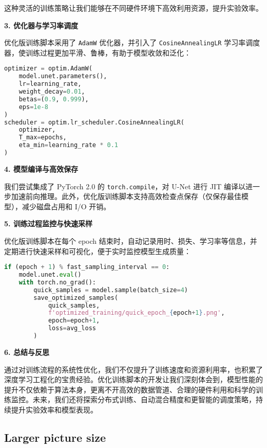 \documentclass{ctexart}
\begin{document}
这种灵活的训练策略让我们能够在不同硬件环境下高效利用资源，提升实验效率。

\vspace{0.5em}
\noindent
\textbf{3. 优化器与学习率调度}

优化版训练脚本采用了 \texttt{AdamW} 优化器，并引入了 \texttt{CosineAnnealingLR} 学习率调度器，使训练过程更加平滑、鲁棒，有助于模型收敛和泛化：

\begin{lstlisting}[language=python]
optimizer = optim.AdamW(
    model.unet.parameters(), 
    lr=learning_rate,
    weight_decay=0.01,
    betas=(0.9, 0.999),
    eps=1e-8
)
scheduler = optim.lr_scheduler.CosineAnnealingLR(
    optimizer, 
    T_max=epochs,
    eta_min=learning_rate * 0.1
)
\end{lstlisting}

\vspace{0.5em}
\noindent
\textbf{4. 模型编译与高效保存}

我们尝试集成了 PyTorch 2.0 的 \texttt{torch.compile}，对 U-Net 进行 JIT 编译以进一步加速前向推理。此外，优化版训练脚本支持高效检查点保存（仅保存最佳模型），减少磁盘占用和 I/O 开销。

\vspace{0.5em}
\noindent
\textbf{5. 训练过程监控与快速采样}

优化版训练脚本在每个 epoch 结束时，自动记录用时、损失、学习率等信息，并定期进行快速采样和可视化，便于实时监控模型生成质量：

\begin{lstlisting}[language=python]
if (epoch + 1) % fast_sampling_interval == 0:
    model.unet.eval()
    with torch.no_grad():
        quick_samples = model.sample(batch_size=4)
        save_optimized_samples(
            quick_samples, 
            f'optimized_training/quick_epoch_{epoch+1}.png',
            epoch=epoch+1,
            loss=avg_loss
        )
\end{lstlisting}

\vspace{0.5em}
\noindent
\textbf{6. 总结与反思}

通过对训练流程的系统性优化，我们不仅提升了训练速度和资源利用率，也积累了深度学习工程化的宝贵经验。优化训练脚本的开发让我们深刻体会到，模型性能的提升不仅依赖于算法本身，更离不开高效的数据管道、合理的硬件利用和科学的训练监控。未来，我们还将探索分布式训练、自动混合精度和更智能的调度策略，持续提升实验效率和模型表现。


\subsection{Larger picture size}
\end{document}
